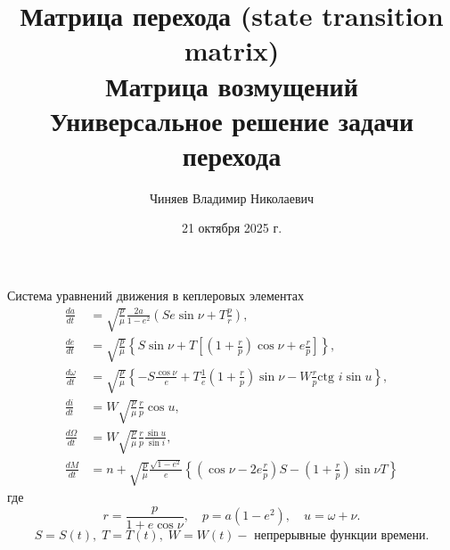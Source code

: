 \documentclass[8pt]{beamer}
\author[Автор]{Чиняев Владимир Николаевич}
\title{Матрица перехода (state transition matrix) \\ Матрица возмущений \\ Универсальное решение задачи перехода}
\institute[]{Московский физико технический институт}
\date{21 октября 2025 г.}
\begin{document}
\begin{frame}
\titlepage
\end{frame}

\begin{frame}{Система уравнений движения в кеплеровых элементах}
\begin{equation*}
    \begin{aligned}
        \frac{da}{dt} &= \sqrt{\frac{p}{\mu}} \frac{2a}{1 - e^2} \left( S e \sin \nu + T \frac{p}{r} \right), \\
        \frac{de}{dt} &= \sqrt{\frac{p}{\mu}} \left\{ S \sin \nu + T \left[ \left(1 + \frac{r}{p} \right) \cos \nu + e \frac{r}{p} \right] \right\}, \\
        \frac{d \omega}{dt} &= \sqrt{\frac{p}{\mu}} \left\{ -S \frac{\cos \nu}{e} + T \frac{1}{e}  \left(1 + \frac{r}{p} \right) \sin \nu - W \frac{r}{p} \text{ctg } i \sin u  \right\}, \\
        \frac{d i}{dt} &= W \sqrt{\frac{p}{\mu}} \frac{r}{p} \cos u, \\
        \frac{d \Omega}{dt} &= W \sqrt{\frac{p}{\mu}} \frac{r}{p} \frac{\sin u}{\sin i}, \\
        \frac{d M}{dt} &= n + \sqrt{\frac{p}{\mu}} \frac{\sqrt{1 - e^2}}{e} \left\{ \left( \cos \nu - 2e \frac{r}{p} \right) S - \left(1 + \frac{r}{p} \right) \sin \nu T \right\}
    \end{aligned}
\end{equation*}
где 
\begin{equation*}
    r = \frac{p}{1 + e \cos \nu}, \quad p = a (1 - e^2), \quad u = \omega + \nu.
\end{equation*}
\begin{equation*}
    S = S(t), \; T = T(t), \; W = W(t) - \text{ непрерывные функции времени}.
\end{equation*}
\end{frame}
\end{document}
